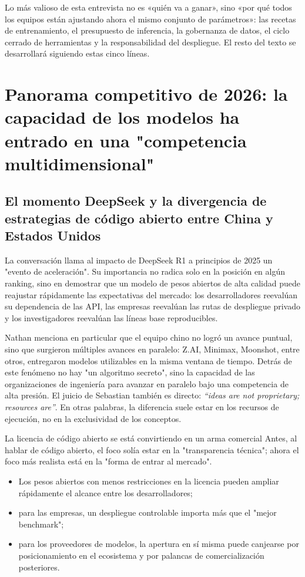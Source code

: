 \documentclass[a4paper]{article}
\begin{document}
Lo más valioso de esta entrevista no es «quién va a ganar», sino «por qué todos los equipos están ajustando ahora el mismo conjunto de parámetros»: las recetas de entrenamiento, el presupuesto de inferencia, la gobernanza de datos, el ciclo cerrado de herramientas y la responsabilidad del despliegue. El resto del texto se desarrollará siguiendo estas cinco líneas.
\section{Panorama competitivo de 2026: la capacidad de los modelos ha entrado en una "competencia multidimensional"}

\subsection{El momento DeepSeek y la divergencia de estrategias de código abierto entre China y Estados Unidos}

La conversación llama al impacto de DeepSeek R1 a principios de 2025 un "evento de aceleración". Su importancia no radica solo en la posición en algún ranking, sino en demostrar que un modelo de pesos abiertos de alta calidad puede reajustar rápidamente las expectativas del mercado: los desarrolladores reevalúan su dependencia de las API, las empresas reevalúan las rutas de despliegue privado y los investigadores reevalúan las líneas base reproducibles.

Nathan menciona en particular que el equipo chino no logró un avance puntual, sino que surgieron múltiples avances en paralelo: Z.AI, Minimax, Moonshot, entre otros, entregaron modelos utilizables en la misma ventana de tiempo. Detrás de este fenómeno no hay "un algoritmo secreto", sino la capacidad de las organizaciones de ingeniería para avanzar en paralelo bajo una competencia de alta presión. El juicio de Sebastian también es directo: \textit{``ideas are not proprietary; resources are''}. En otras palabras, la diferencia suele estar en los recursos de ejecución, no en la exclusividad de los conceptos.

\begin{importantbox}{La licencia de código abierto se está convirtiendo en un arma comercial}
Antes, al hablar de código abierto, el foco solía estar en la "transparencia técnica"; ahora el foco más realista está en la "forma de entrar al mercado".
\begin{itemize}[leftmargin=1.5em]
    \item Los pesos abiertos con menos restricciones en la licencia pueden ampliar rápidamente el alcance entre los desarrolladores;
    \item para las empresas, un despliegue controlable importa más que el "mejor benchmark";
    \item para los proveedores de modelos, la apertura en sí misma puede canjearse por posicionamiento en el ecosistema y por palancas de comercialización posteriores.
\end{itemize}
\end{importantbox}
\end{document}
